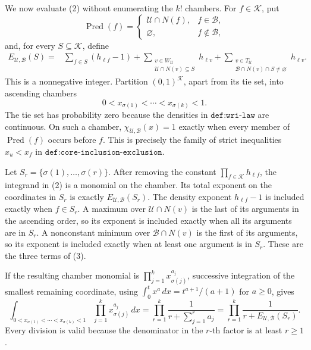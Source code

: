 We now evaluate (2) without enumerating the \(k!\) chambers.  For \(f\in\mathcal K\), put
\[
 \operatorname{Pred}(f)=
 \begin{cases}
 \mathcal U\cap N(f),&f\in\mathcal B,\\
 \varnothing,&f\notin\mathcal B,
 \end{cases}
\]
and, for every \(S\subseteq\mathcal K\), define
\[
\begin{split}
 E_{\mathcal U,\mathcal B}(S)={}&
 \sum_{f\in S}(h_{\ell f}-1)
 +\sum_{\substack{v\in W_{\mathcal U}\\
                    \mathcal U\cap N(v)\subseteq S}}h_{\ell v}
 +\sum_{\substack{v\in T_{\mathcal U}\\
                    \mathcal B\cap N(v)\cap S\neq\varnothing}}h_{\ell v}.                 \tag{3}
\end{split}
\]
This is a nonnegative integer.  Partition \((0,1)^{\mathcal K}\), apart from its tie set, into ascending chambers
\[
 0<x_{\sigma(1)}<\cdots<x_{\sigma(k)}<1.
\]
The tie set has probability zero because the densities in \(\texttt{def:wri-law}\) are continuous.  On such a chamber, \(\chi_{\mathcal U,\mathcal B}(x)=1\) exactly when every member of \(\operatorname{Pred}(f)\) occurs before \(f\).  This is precisely the family of strict inequalities \(x_u<x_f\) in \(\texttt{def:core-inclusion-exclusion}\).

Let \(S_r=\{\sigma(1),\ldots,\sigma(r)\}\).  After removing the constant \(\prod_{f\in\mathcal K}h_{\ell f}\), the integrand in (2) is a monomial on the chamber.  Its total exponent on the coordinates in \(S_r\) is exactly \(E_{\mathcal U,\mathcal B}(S_r)\).  The density exponent \(h_{\ell f}-1\) is included exactly when \(f\in S_r\).  A maximum over \(\mathcal U\cap N(v)\) is the last of its arguments in the ascending order, so its exponent is included exactly when all its arguments are in \(S_r\).  A nonconstant minimum over \(\mathcal B\cap N(v)\) is the first of its arguments, so its exponent is included exactly when at least one argument is in \(S_r\).  These are the three terms of (3).

If the resulting chamber monomial is \(\prod_{j=1}^k x_{\sigma(j)}^{a_j}\), successive integration of the smallest remaining coordinate, using \(\int_0^t x^a\,dx=t^{a+1}/(a+1)\) for \(a\geq0\), gives
\[
 \int_{0<x_{\sigma(1)}<\cdots<x_{\sigma(k)}<1}
 \prod_{j=1}^k x_{\sigma(j)}^{a_j}\,dx
 =\prod_{r=1}^k
 \frac{1}{r+\sum_{j=1}^r a_j}
 =\prod_{r=1}^k\frac{1}{r+E_{\mathcal U,\mathcal B}(S_r)}.                    \tag{4}
\]
Every division is valid because the denominator in the \(r\)-th factor is at least \(r\geq1\).

